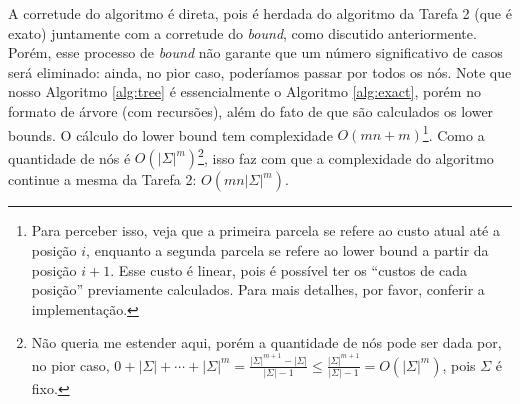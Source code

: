 A corretude do algoritmo é direta, pois é herdada do algoritmo da Tarefa 2 (que é exato) juntamente com a corretude do \textit{bound}, como discutido anteriormente. Porém, esse processo de \textit{bound} não garante que um número significativo de casos será eliminado: ainda, no pior caso, poderíamos passar por todos os nós.
Note que nosso Algoritmo \ref{alg:tree} é essencialmente o Algoritmo \ref{alg:exact}, porém no formato de árvore (com recursões), além do fato de que são calculados os lower bounds. O cálculo do lower bound tem complexidade $O(mn + m)$\footnote{Para perceber isso, veja que a primeira parcela se refere ao custo atual até a posição $i$, enquanto a segunda parcela se refere ao lower bound a partir da posição $i+1$. Esse custo é linear, pois é possível ter os ``custos de cada posição'' previamente calculados. Para mais detalhes, por favor, conferir a implementação.}.
Como a quantidade de nós é $O(|\Sigma|^{m})$\footnote{Não queria me estender aqui, porém a quantidade de nós pode ser dada por, no pior caso, $0 + |\Sigma| + \cdots + |\Sigma|^m = \frac{|\Sigma|^{m+1}-|\Sigma|}{|\Sigma| - 1} \le \frac{|\Sigma|^{m+1}}{|\Sigma| - 1} = O(|\Sigma|^m)$, pois $\Sigma$ é fixo.}, isso faz com que a complexidade do algoritmo continue a mesma da Tarefa 2: $O(mn|\Sigma|^{m})$.
